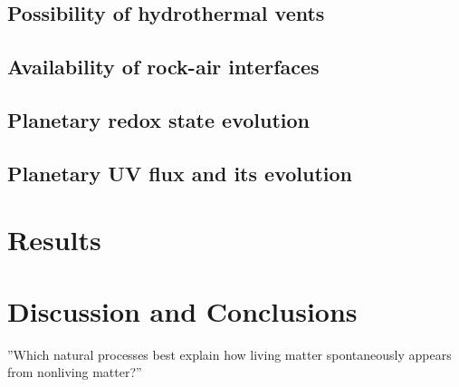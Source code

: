 \documentclass[twocolumn]{aastex631}
\begin{document}
\subsection{Possibility of hydrothermal vents}

\subsection{Availability of rock-air interfaces}

\subsection{Planetary redox state evolution}

\subsection{Planetary UV flux and its evolution}


\section{Results}
\label{sec:results}

\section{Discussion and Conclusions}
\label{sec:discussion}

''Which natural processes best explain how living matter spontaneously appears from nonliving matter?''~\citep{Malaterre2022}


\end{document}
